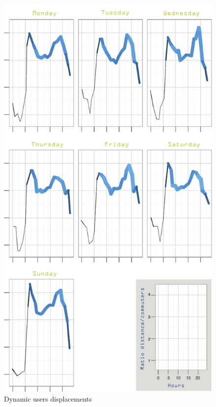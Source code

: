 \begin{figure}[h]
\begin{center}
\includegraphics[scale = 0.8] {results/images/commuting_results.pdf}
\caption{Dynamic users displacements}
\label{fig:dynamic_displacements}
\end{center}
\end{figure}

